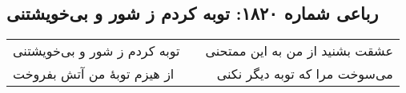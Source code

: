 \begin{center}
\section*{رباعی شماره ۱۸۲۰: توبه کردم ز شور و بی‌خویشتنی}
\label{sec:1820}
\begin{longtable}{l p{0.5cm} r}
توبه کردم ز شور و بی‌خویشتنی
&&
عشقت بشنید از من به این ممتحنی
\\
از هیزم توبهٔ من آتش بفروخت
&&
می‌سوخت مرا که توبه دیگر نکنی
\\
\end{longtable}
\end{center}
